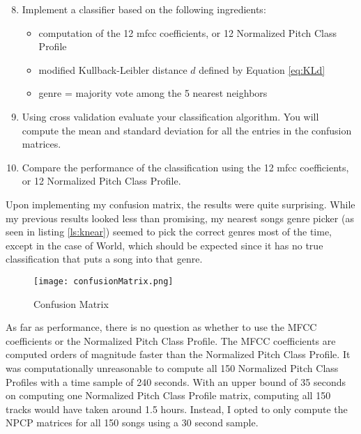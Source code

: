 \documentclass{article} %
\begin{document}
\begin{framed}
\begin{enumerate}
\setcounter{enumi}{7}
\item Implement a classifier based on the following ingredients:
\begin{itemize}
\item computation of the 12 mfcc coefficients, or 12 Normalized Pitch Class Profile
\item modified Kullback-Leibler distance $d$ defined by Equation \ref{eq:KLd}
\item genre = majority vote among the 5 nearest neighbors
\end{itemize}
\item Using cross validation evaluate your classification algorithm. You will compute the mean and standard deviation for all the entries in the confusion matrices. 
\item Compare the performance of the classification using the 12 mfcc coefficients, or 12 Normalized Pitch Class Profile. 
\end{enumerate}
\end{framed}

Upon implementing my confusion matrix, the results were quite surprising. While my previous results looked less than promising, my nearest songs genre picker 
(as seen in listing \ref{ls:knear}) seemed to pick the correct genres most of the time, except in the case of World, which should be expected since it has no true classification
that puts a song into that genre. 

\begin{figure}[H]
\centering
\texttt{[image: confusionMatrix.png]}
\caption{Confusion Matrix}
\label{fig:confM}
\end{figure}

 


As far as performance, there is no question as whether to use the MFCC coefficients or the Normalized Pitch Class Profile. The MFCC coefficients are computed orders of magnitude faster
than the Normalized Pitch Class Profile. It was computationally unreasonable to compute all 150 Normalized Pitch Class Profiles with a time sample of 240 seconds. With an upper bound of 
35 seconds on computing one Normalized Pitch Class Profile matrix, computing all 150 tracks would have taken around 1.5 hours. Instead, I opted to only compute the NPCP matrices
for all 150 songs using a 30 second sample. 
\end{document}
